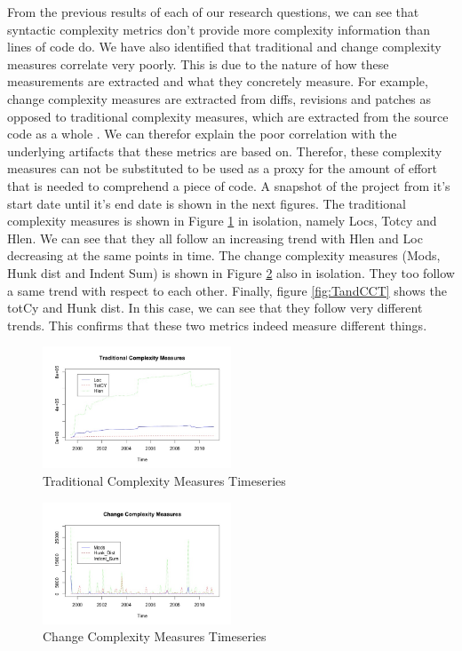 \documentclass[9pt,twocolumn,a4paper]{article}
\begin{document}
From the previous results of each of our research questions, we can see that syntactic complexity metrics don't provide more complexity information than lines of code do. We have also identified that traditional and change complexity measures correlate very poorly. This is due to the nature of how these measurements are extracted and what they concretely measure. For example, change complexity measures are extracted from diffs, revisions and patches as opposed to traditional complexity measures, which are extracted from the source code as a whole \cite{Hindle}. We can therefor explain the poor correlation with the underlying artifacts that these metrics are based on. Therefor, these complexity measures can not be substituted to be used as a proxy for the amount of effort that is needed to comprehend a piece of code. \newline
A snapshot of the project from it's start date until it's end date is shown in the next figures. The traditional complexity measures is shown in Figure \ref{fig:tct} in isolation, namely Locs, Totcy and Hlen. We can see that they all follow an increasing trend with Hlen and Loc decreasing at the same points in time.\newline
The change complexity measures (Mods, Hunk dist and Indent Sum) is shown in Figure \ref{fig:cct} also in isolation. They too follow a same trend with respect to each other. Finally, figure \ref{fig:TandCCT} shows the totCy and Hunk dist. In this case, we can see that they follow very different trends. This confirms that these two metrics indeed measure different things.





\begin{figure}[h!]
  \centering
  \includegraphics[width=0.5\textwidth]
  {TradPlot}
   \caption{Traditional Complexity Measures Timeseries }
   \label{fig:tct}
\end{figure}

\begin{figure}[h!]
  \centering
  \includegraphics[width=0.5\textwidth]
  {ChangePlot}
   \caption{Change Complexity Measures Timeseries }
   \label{fig:cct}
\end{figure}
\end{document}
